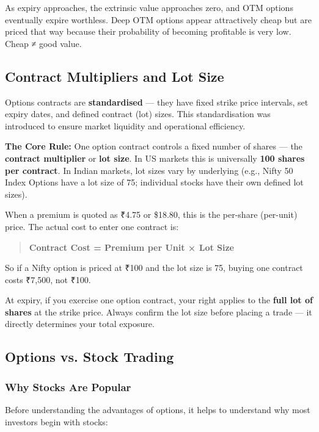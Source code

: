 \documentclass[12pt,openany]{book}
\begin{document}
As expiry approaches, the extrinsic value approaches zero, and OTM options eventually expire worthless. Deep OTM options appear attractively cheap but are priced that way because their probability of becoming profitable is very low. Cheap ≠ good value.


\subsection{Contract Multipliers and Lot Size}

Options contracts are \textbf{standardised} — they have fixed strike price intervals, set expiry dates, and defined contract (lot) sizes. This standardisation was introduced to ensure market liquidity and operational efficiency.

\textbf{The Core Rule:} One option contract controls a fixed number of shares — the \textbf{contract multiplier} or \textbf{lot size}. In US markets this is universally \textbf{100 shares per contract}. In Indian markets, lot sizes vary by underlying (e.g., Nifty 50 Index Options have a lot size of 75; individual stocks have their own defined lot sizes).

When a premium is quoted as ₹4.75 or \$18.80, this is the per-share (per-unit) price. The actual cost to enter one contract is:

\begin{quote}
\textbf{Contract Cost = Premium per Unit × Lot Size}
\end{quote}

So if a Nifty option is priced at ₹100 and the lot size is 75, buying one contract costs ₹7,500, not ₹100.

At expiry, if you exercise one option contract, your right applies to the \textbf{full lot of shares} at the strike price. Always confirm the lot size before placing a trade — it directly determines your total exposure.


\subsection{Options vs. Stock Trading}

\subsubsection{Why Stocks Are Popular}

Before understanding the advantages of options, it helps to understand why most investors begin with stocks:
\end{document}
